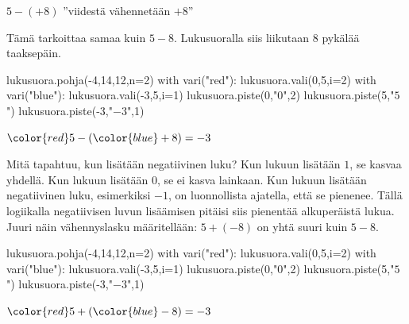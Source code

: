     $5-(+8)$ ''viidestä vähennetään $+8$''
    
    Tämä tarkoittaa samaa kuin $5-8$. Lukusuoralla siis liikutaan 8 pykälää taaksepäin.

\vspace{0.3cm}     
    
\begin{center}
\begin{kuva}
	lukusuora.pohja(-4,14,12,n=2)
	with vari("red"):
		lukusuora.vali(0,5,i=2)
	with vari("blue"): lukusuora.vali(-3,5,i=1)
	lukusuora.piste(0,"$0$",2)
	lukusuora.piste(5,"$5$")
	lukusuora.piste(-3,"$-3$",1)
\end{kuva}
       ${\color{red}5}-({\color{blue}+8})=-3$
\end{center}


    
Mitä tapahtuu, kun lisätään negatiivinen luku? Kun lukuun lisätään $1$, se kasvaa yhdellä. Kun lukuun lisätään $0$, se ei kasva lainkaan. Kun lukuun lisätään negatiivinen luku, esimerkiksi $-1$, on luonnollista ajatella, että se pienenee. Tällä logiikalla negatiivisen luvun lisäämisen pitäisi siis pienentää alkuperäistä lukua. Juuri näin vähennyslasku määritellään: $5+(-8)$ on yhtä suuri kuin $5-8$.
    
\vspace{0.3cm}     
\begin{center}
\begin{kuva}
	lukusuora.pohja(-4,14,12,n=2)
	with vari("red"):
		lukusuora.vali(0,5,i=2)
	with vari("blue"): lukusuora.vali(-3,5,i=1)
	lukusuora.piste(0,"$0$",2)
	lukusuora.piste(5,"$5$")
	lukusuora.piste(-3,"$-3$",1)
\end{kuva}
       ${\color{red}5}+({\color{blue}-8})=-3$
\end{center}
    
